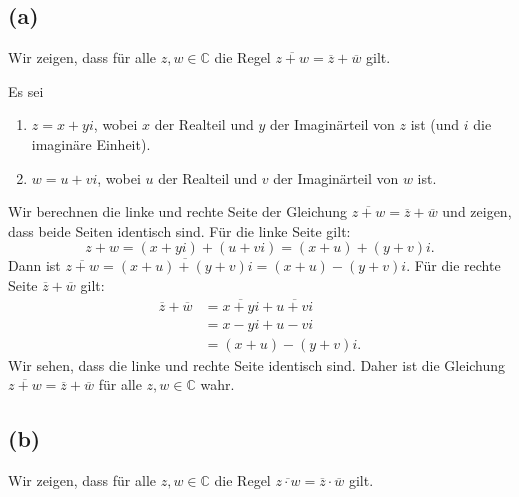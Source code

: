 \documentclass{article}
\theoremstyle{definition}
\theoremstyle{remark}
\begin{document}
\subsection*{(a)}
Wir zeigen, dass für alle \( z, w \in \mathbb{C} \) die Regel \( \overline{z + w} = \overline{z} + \overline{w} \) gilt.

\proof Es sei
\begin{enumerate}
	\item	\( z = x + yi \), wobei \( x \) der Realteil und \( y \) der Imaginärteil von \( z \) ist (und \( i \) die imaginäre Einheit).
	\item	\( w = u + vi \), wobei \( u \) der Realteil und \( v \) der Imaginärteil von \( w \) ist.
\end{enumerate}
Wir berechnen die linke und rechte Seite der Gleichung \( \overline{z + w} = \overline{z} + \overline{w} \) und zeigen, dass beide Seiten identisch sind.
Für die linke Seite gilt:
\[ z + w = (x + yi) + (u + vi) = (x + u) + (y + v)i. \]
Dann ist \( \overline{z + w} = \overline{(x + u) + (y + v)i} = (x + u) - (y + v)i \). Für die rechte Seite \( \overline{z} + \overline{w} \) gilt:
\begin{align*}
	\overline{z} + \overline{w} & = \overline{x + yi} + \overline{u + vi} \\
	                            & = x - yi + u - vi                       \\
	                            & = (x + u) - (y + v)i.
\end{align*}
Wir sehen, dass die linke und rechte Seite identisch sind. Daher ist die Gleichung \( \overline{z + w} = \overline{z} + \overline{w} \) für alle \( z, w \in \mathbb{C} \) wahr.
\endproof

\subsection*{(b)}
Wir zeigen, dass für alle \( z, w \in \mathbb{C} \) die Regel \( \overline{z \cdot w} = \overline{z} \cdot \overline{w} \) gilt.
\end{document}
